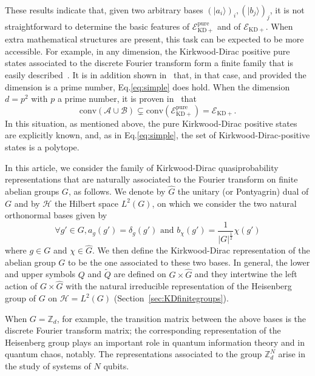\documentclass[a4paper, notitlepage, 11pt]{article}
\numberwithin{equation}{section}
\newcommand{\mcl}[1]{\ensuremath{\mathcal{#1}}}
\newcommand{\Acal}{{\mcl A}}
\newcommand{\Bcal}{{\mcl B}}
\newcommand{\EcalKDC}{{\mcl E}_{\mathrm{KD+}}}
\newcommand{\EcalKDCpu}{{\mcl E}_{\mathrm{KD+}}^{\mathrm{pure}}}
\newcommand{\Hcal}{{\mcl H}}
\newcommand{\Z}{\mathbb{Z}}
\newcommand{\conv}[1]{\mathrm{conv}\left(#1\right)}
\renewcommand{\H}{\mcl{H}}
\newcommand{\convAB}{\conv{\Acal \cup \Bcal}}
\begin{document}
 These results indicate that, given two arbitrary bases $(|a_i\rangle)_i, (|b_j\rangle)_j$, it is not straightforward to determine the basic features of $\EcalKDCpu$ and of $\EcalKDC$. When extra mathematical structures are present, this task can be expected to be more accessible.  For example,  in any dimension, the Kirkwood-Dirac positive pure states associated to the discrete Fourier transform form a finite family that is easily described~\cite{XU2024,MaOzPr04}. 
 It is in addition shown in~\cite{langrenez2023characterizing2} that, in that case, and provided the dimension is a prime number, Eq.\eqref{eq:simple} does hold.  When the dimension  $d=p^{2}$ with $p$ a prime number, it is proven in~\cite{Yang_2024} that 
 \begin{equation}\label{eq:almostsimple}
    \convAB\subsetneq \conv{\EcalKDCpu} = \EcalKDC.
\end{equation}
In this situation, as mentioned above, the pure Kirkwood-Dirac positive states are explicitly known, and, as in Eq.\eqref{eq:simple}, the set of Kirkwood-Dirac-positive states is a polytope.

 In this article, we consider the family of Kirkwood-Dirac quasiprobability representations that are naturally associated to the Fourier transform on finite abelian groups $G$, as follows. We denote by $\widehat{G}$ the unitary (or Pontyagrin) dual of $G$ and by $\H$
the Hilbert space $L^{2}(G)$, on which we consider the two natural orthonormal bases given by
\begin{equation}\label{eq:BasisStates}
 \forall g'\in G, a_{g}(g') =  \delta_{g}(g') \text{ and } b_{\chi}(g') = \frac{1}{\left|G\right|^{\frac{1}{2}}}\chi(g')
\end{equation}
where $g\in G$ and $\chi\in\widehat{G}$. We then define the Kirkwood-Dirac representation of the abelian group $G$ to be the one associated to these two bases. In general, the lower and upper symbols $Q$ and $\widetilde{Q}$ are defined on $G\times\hat G$ and they intertwine the left action of $G\times \hat G$ with the natural irreducible representation of the Heisenberg group of $G$ on $\Hcal=L^2(G)$ (Section~\ref{sec:KDfinitegroups}).

When $G=\Z_{d}$, for example, the transition matrix between the above bases is the discrete Fourier transform matrix; the corresponding representation of the Heisenberg group plays an important role in quantum information theory and in quantum chaos, notably.  The representations associated to the group  $\Z_d^N$ arise in the study of systems of $N$ qubits.   
\end{document}
